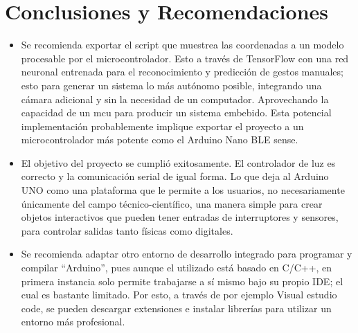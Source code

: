 \section{Conclusiones y Recomendaciones}
\begin{itemize}
  \item Se recomienda exportar el script que muestrea las coordenadas a un modelo procesable por el microcontrolador. Esto a través de TensorFlow con una red neuronal entrenada para el reconocimiento y predicción de gestos manuales; esto para generar un sistema lo más autónomo posible, integrando una cámara adicional y sin la necesidad de un computador. Aprovechando la capacidad de un mcu para producir un sistema embebido. Esta potencial implementación probablemente implique exportar el proyecto a un microcontrolador más potente como el Arduino Nano BLE sense.
  \item El objetivo del proyecto se cumplió exitosamente. El controlador de luz es correcto y la comunicación serial de igual forma. Lo que deja al Arduino UNO como una plataforma que  le permite a los usuarios, no necesariamente únicamente del campo técnico-científico, una manera simple para crear objetos interactivos que pueden tener entradas de interruptores y sensores, para controlar salidas tanto físicas como digitales.
\item Se recomienda adaptar otro entorno de desarrollo integrado para programar y compilar “Arduino”, pues aunque el utilizado está basado en C/C++, en primera instancia solo permite trabajarse a sí mismo  bajo su propio IDE; el cual es bastante limitado. Por esto, a través de por ejemplo Visual estudio code, se pueden descargar extensiones e instalar librerías para utilizar un entorno más profesional.
\end{itemize}